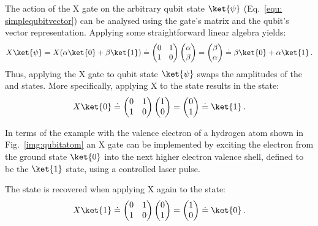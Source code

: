 The action of the X gate on the arbitrary qubit state $\ket{\psi}$ (Eq.~\ref{equ: simplequbitvector}) can be analysed using the gate's matrix and the qubit's vector representation. Applying some straightforward linear algebra yields:
\begin{equation}
\label{equ:xverification1}
X \ket{\psi} = X (\alpha \ket{0} + \beta \ket{1}) \doteq \begin{pmatrix}
 0 & 1 \\ 
 1 & 0
 \end{pmatrix} \begin{pmatrix}
 \alpha  \\ 
 \beta
 \end{pmatrix} = \begin{pmatrix}
 \beta  \\ 
 \alpha
 \end{pmatrix} \doteq \beta \ket{0} + \alpha \ket{1}\, .
\end{equation}
Thus, applying the X gate to qubit state $\ket{\psi}$ swaps the amplitudes of the \0 and \1 states. More specifically, applying X to the \0 state results in the \1 state:
\begin{equation}
\label{equ:xverification2}
X \ket{0} \doteq \begin{pmatrix}
 0 & 1 \\ 
 1 & 0
 \end{pmatrix} \begin{pmatrix}
 1  \\ 
 0
 \end{pmatrix} = \begin{pmatrix}
 0  \\ 
 1 \end{pmatrix} \doteq  \ket{1}\, .
\end{equation}

\newpage
In terms of the example with the valence electron of a hydrogen atom shown in Fig.~\ref{img:qubitatom} an X gate can be implemented by exciting the electron from the ground state $\ket{0}$ into the next higher electron valence shell, defined to be the $\ket{1}$ state, using a controlled laser pulse.

The \0 state is recovered when applying X again to the \1 state:
\begin{equation}
\label{equ:xverification3}
X \ket{1} \doteq \begin{pmatrix}
 0 & 1 \\ 
 1 & 0
 \end{pmatrix} \begin{pmatrix}
 0  \\ 
 1
 \end{pmatrix} = \begin{pmatrix}
 1  \\ 
 0 \end{pmatrix} \doteq  \ket{0}\, .
\end{equation}

